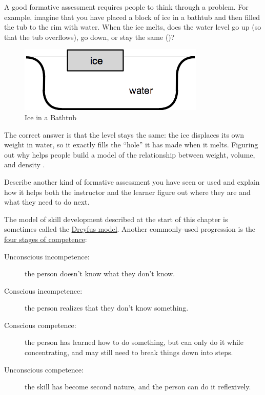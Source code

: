 A good formative assessment requires people to think through a
problem.  For example, imagine that you have placed a block of ice in
a bathtub and then filled the tub to the rim with water.  When the ice
melts, does the water level go up (so that the tub overflows), go
down, or stay the same ()?

\begin{figure}
\centering
\includegraphics{../docs/fig/bathtub.png}
\caption{Ice in a Bathtub}
\label{f:models-bathtub}
\end{figure}

The correct answer is that the level stays the same: the ice displaces
its own weight in water, so it exactly fills the ``hole'' it has made
when it melts. Figuring out why helps people build a model of the
relationship between weight, volume, and density \cite{Epst2002}.

Describe another kind of formative assessment you have seen or used and
explain how it helps both the instructor and the learner figure out
where they are and what they need to do next.


The model of skill development described at the start of this chapter
is sometimes called the
\href{https://en.wikipedia.org/wiki/Dreyfus_model\_of\_skill\_acquisition}{Dreyfus
  model}.  Another commonly-used progression is the
\href{https://en.wikipedia.org/wiki/Four_stages_of_competence}{four
  stages of competence}:

\begin{description}

  \item[Unconscious incompetence:] the person doesn't know what they
    don't know.

  \item[Conscious incompetence:] the person realizes that they don't
    know something.

  \item[Conscious competence:] the person has learned how to do
    something, but can only do it while concentrating, and may still
    need to break things down into steps.

  \item[Unconscious competence:] the skill has become second nature,
    and the person can do it reflexively.

\end{description}


